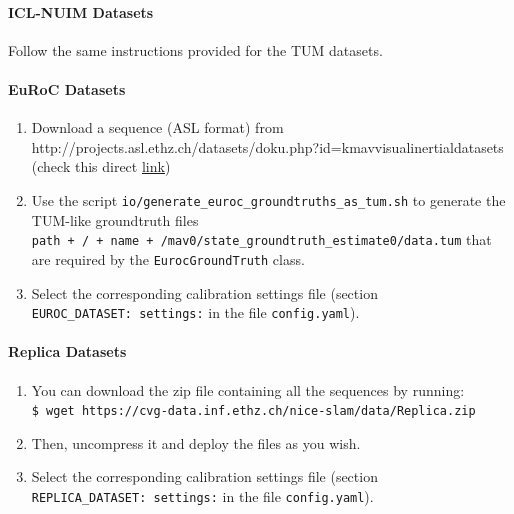 \documentclass{article}
\providecommand{\tightlist}{%
  \setlength{\itemsep}{0pt}\setlength{\parskip}{0pt}}
\let\oldparagraph\paragraph
\renewcommand{\paragraph}[1]{\oldparagraph{#1}\mbox{}}
\begin{document}
\hypertarget{icl-nuim-datasets}{%
\paragraph{ICL-NUIM Datasets}\label{icl-nuim-datasets}}

Follow the same instructions provided for the TUM datasets.

\hypertarget{euroc-datasets}{%
\paragraph{EuRoC Datasets}\label{euroc-datasets}}

\begin{enumerate}
\def\labelenumi{\arabic{enumi}.}
\tightlist
\item
  Download a sequence (ASL format) from
  http://projects.asl.ethz.ch/datasets/doku.php?id=kmavvisualinertialdatasets
  (check this direct
  \href{http://robotics.ethz.ch/~asl-datasets/ijrr_euroc_mav_dataset/}{link})
\item
  Use the script \texttt{io/generate\_euroc\_groundtruths\_as\_tum.sh}
  to generate the TUM-like groundtruth files
  \texttt{path\ +\ \textquotesingle{}/\textquotesingle{}\ +\ name\ +\ \textquotesingle{}/mav0/state\_groundtruth\_estimate0/data.tum\textquotesingle{}}
  that are required by the \texttt{EurocGroundTruth} class.
\item
  Select the corresponding calibration settings file (section
  \texttt{EUROC\_DATASET:\ settings:} in the file \texttt{config.yaml}).
\end{enumerate}

\hypertarget{replica-datasets}{%
\paragraph{Replica Datasets}\label{replica-datasets}}

\begin{enumerate}
\def\labelenumi{\arabic{enumi}.}
\tightlist
\item
  You can download the zip file containing all the sequences by
  running:\\
  \texttt{\$\ wget\ https://cvg-data.inf.ethz.ch/nice-slam/data/Replica.zip}~\\
\item
  Then, uncompress it and deploy the files as you wish.
\item
  Select the corresponding calibration settings file (section
  \texttt{REPLICA\_DATASET:\ settings:} in the file
  \texttt{config.yaml}).
\end{enumerate}
\end{document}
